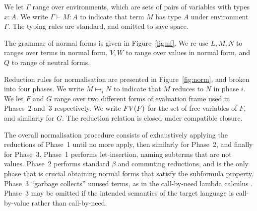 We let $\Gamma$ range over environments, which are sets of pairs of
variables with types $x:A$. We write $\Gamma \vdash M:A$ to indicate
that term $M$ has type $A$ under environment $\Gamma$. The typing
rules are standard, and omitted to save space.

The grammar of normal forms is given in Figure~\ref{fig:nf}. We re-use
$L,M,N$ to ranges over terms in normal form, $V,W$ to range over
values in normal form, and $Q$ to range of neutral forms.

Reduction rules for normalisation are presented in
Figure~\ref{fig:norm}, and broken into four phases. We write $M
\mapsto_i N$ to indicate that $M$ reduces to $N$ in phase $i$. We let
$F$ and $G$ range over two different forms of evaluation frame used in
Phases~2 and~3 respectively. We write $\text{\textit{FV}}(F)$ for the set of free
variables of $F$, and similarly for $G$.
%
The reduction relation is closed under compatible closure.

The overall normalisation procedure consists of exhaustively applying
the reductions of Phase~1 until no more apply, then similarly for
Phase~2, and finally for Phase~3. Phase~1 performs let-insertion,
naming subterms that are not values.
Phase~2 performs standard $\beta$ and commuting reductions, and is the
only phase that is crucial obtaining normal forms that satisfy the
subformula property. Phase~3 ``garbage collects'' unused terms, as in
the call-by-need lambda calculus \citep{call-by-need}. Phase~3 may be
omitted if the intended semantics of the target language is
call-by-value rather than call-by-need.



